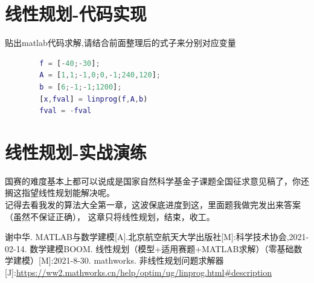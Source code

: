 \documentclass[a4paper,20pt]{article}
\begin{document}
\section{线性规划-代码实现}
    \par 贴出matlab代码求解,请结合前面整理后的式子来分别对应变量
    \begin{center}
    \begin{lstlisting}[caption={Linprog},language=Matlab]
        % Linear Programming
        f = [-40;-30];  
        A = [1,1;-1,0;0,-1;240,120];   
        b = [6;-1;-1;1200];             
        [x,fval] = linprog(f,A,b)
        fval = -fval
        \end{lstlisting}
    \end{center}
    \section{线性规划-实战演练}
    \par 国赛的难度基本上都可以说成是国家自然科学基金子课题全国征求意见稿了，你还搁这指望线性规划能解决呢。
    \\记得去看我发的算法大全第一章，这波保底进度到这，里面题我做完发出来答案（虽然不保证正确），
    这章只将线性规划，结束，收工。
\newpage
\begin{thebibliography}{99}  

    谢中华. MATLAB与数学建模[A].北京航空航天大学出版社[M]:科学技术协会,2021-02-14.
    数学建模BOOM. 线性规划（模型+适用赛题+MATLAB求解）（零基础数学建模）[M]:2021-8-30.
    mathworks. 非线性规划问题求解器[J]:\url{https://ww2.mathworks.cn/help/optim/ug/linprog.html#description}
    
    \end{thebibliography}
\newpage
\end{document}
